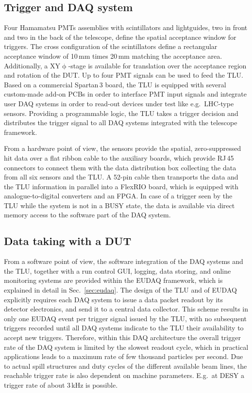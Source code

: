 \subsection{Trigger and DAQ system}

Four Hamamatsu PMTs assemblies with scintillators and lightguides, two in front and two in the back of the telescope, define the spatial acceptance window for triggers. 
The cross configuration of the scintillators define a rectangular acceptance window of 10\,mm times 20\,mm matching the \Mimosa acceptance area. 
Additionally, a XY$\upphi$-stage is available for translation over the acceptance region and rotation of the DUT. 
Up to four PMT signals can be used to feed the TLU. 
Based on a commercial Spartan\,3 board, the TLU is equipped with several custom-made add-on PCBs in order to interface PMT input signals
 and integrate user DAQ systems in order to read-out devices under test like e.g.~LHC-type sensors. 
Providing a programmable logic, the TLU  takes a trigger decision and distributes the trigger signal to all DAQ systems integrated with the telescope framework.

From a hardware point of view, the \Mimosa sensors provide the spatial, zero-suppressed hit data over a flat ribbon cable to the auxiliary boards, which provide RJ\,45 connectors to connect them with the
 data distribution box collecting the data from all six sensors and the TLU. 
A 52-pin cable then transports the data and the TLU information in parallel into a FlexRIO board, which is equipped with analogue-to-digital converters and an FPGA. 
In case of a trigger seen by the TLU while the system is not in a BUSY state, the data is available via direct memory access to the software part of the DAQ system. 

\subsection{Data taking with a DUT}

From a software point of view, the software integration of the DAQ systems and the TLU, together with a run control GUI, logging, data storing, and online monitoring systems are provided within the EUDAQ framework,
 which is explained in detail in Sec.~\ref{sec:eudaq}. 
The design of the TLU and of EUDAQ explicitly requires each DAQ system to issue a data packet readout by its detector electronics, and send it to a central data collector. 
This scheme results in only one EUDAQ event per trigger signal issued by the TLU, with no subsequent triggers recorded until all DAQ systems indicate to the TLU their availability to accept new triggers.
Therefore, within this DAQ architecture the overall trigger rate of the DAQ system is limited by the slowest readout cycle,
 which in practical applications leads to a maximum rate of few thousand particles per second. 
Due to actual spill structures and duty cycles of the different available beam lines, the reachable trigger rate is also dependent on machine parameters. 
E.g.~at DESY a trigger rate of about 3\,kHz is possible. 



